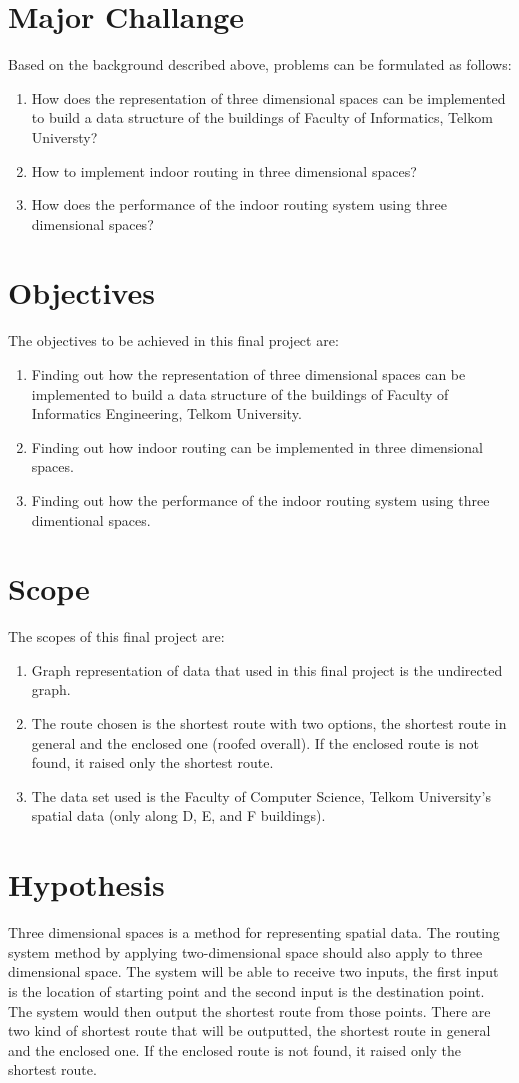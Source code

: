 \section{Major Challange}
Based on the background described above, problems can be formulated as follows:
\begin{enumerate}
    \item How does the representation of three dimensional spaces can be implemented to build a data structure of the buildings of Faculty of Informatics, Telkom Universty?
    \item How to implement indoor routing in three dimensional spaces?
    \item How does the performance of the indoor routing system using three dimensional spaces?
\end{enumerate}
\section{Objectives}
The objectives to be achieved in this final project are:
\begin{enumerate}
    \item Finding out how the representation of three dimensional spaces can be implemented to build a data structure of the buildings of Faculty of Informatics Engineering, Telkom University.
    \item Finding out how indoor routing can be implemented in three dimensional spaces.
    \item Finding out how the performance of the indoor routing system using three dimentional spaces.
\end{enumerate}
\section{Scope}
The scopes of this final project are:
\begin{enumerate}
	\item Graph representation of data that used in this final project is the undirected graph.
	\item The route chosen is the shortest route with two options, the shortest route in general and the enclosed one (roofed overall). If the enclosed route is not found, it raised only the shortest route.
	\item The data set used is the Faculty of Computer Science, Telkom University’s spatial data (only along D, E, and F buildings).
\end{enumerate}
\section{Hypothesis}
Three dimensional spaces is a method for representing spatial data. The routing system method by applying two-dimensional space should also apply to three dimensional space. The system will be able to receive two inputs, the first input is the location of starting point and the second input is the destination point. The system would then output the shortest route from those points. There are two kind of shortest route that will be outputted, the shortest route in general and the enclosed one. If the enclosed route is not found, it raised only the shortest route.
